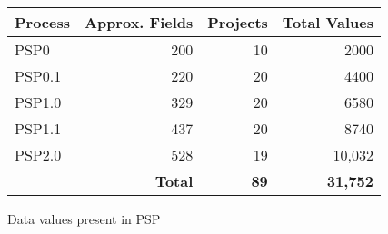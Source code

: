 \begin{figure}
   \begin{center} 
   \begin{tabular}{|l|r|r|r|}\hline 
   Process & Approx. Fields & Projects & Total Values \\ \hline\hline 
   PSP0    & 200 &  10 &  2000 \\ \hline 
   PSP0.1  & 220 &  20 &  4400 \\ \hline 
   PSP1.0  & 329 &  20 &  6580 \\ \hline 
   PSP1.1  & 437 &  20 &  8740 \\ \hline  
   PSP2.0  & 528 &  19 &  10,032 \\ \hline 
   \multicolumn{2}{|r|}{\bf Total} &  {\bf 89} &  {\bf 31,752} \\ \hline 
   \end{tabular} \newline \newline
   \end{center} 
   \caption{\label{overallErrors}Data values present in PSP}
\end{figure}





